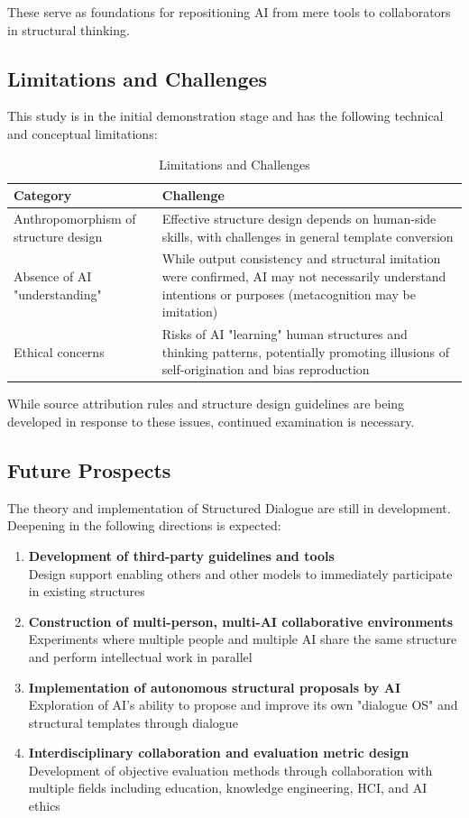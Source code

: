 \documentclass[11pt]{article}
\begin{document}
These serve as foundations for repositioning AI from mere tools to collaborators in structural thinking.
\subsection{Limitations and Challenges}
This study is in the initial demonstration stage and has the following technical and conceptual limitations:

\begin{table}[htbp]
\centering
\caption{Limitations and Challenges}
\begin{tabular}{p{4cm}|p{8cm}}
\hline
\textbf{Category} & \textbf{Challenge} \\
\hline
Anthropomorphism of structure design & Effective structure design depends on human-side skills, with challenges in general template conversion \\
\hline
Absence of AI "understanding" & While output consistency and structural imitation were confirmed, AI may not necessarily understand intentions or purposes (metacognition may be imitation) \\
\hline
Ethical concerns & Risks of AI "learning" human structures and thinking patterns, potentially promoting illusions of self-origination and bias reproduction \\
\hline
\end{tabular}
\label{tab:limitations}
\end{table}

While source attribution rules and structure design guidelines are being developed in response to these issues, continued examination is necessary.
\subsection{Future Prospects}
The theory and implementation of Structured Dialogue are still in development. Deepening in the following directions is expected:

\begin{enumerate}
\item \textbf{Development of third-party guidelines and tools} \\
Design support enabling others and other models to immediately participate in existing structures

\item \textbf{Construction of multi-person, multi-AI collaborative environments} \\
Experiments where multiple people and multiple AI share the same structure and perform intellectual work in parallel

\item \textbf{Implementation of autonomous structural proposals by AI} \\
Exploration of AI's ability to propose and improve its own "dialogue OS" and structural templates through dialogue

\item \textbf{Interdisciplinary collaboration and evaluation metric design} \\
Development of objective evaluation methods through collaboration with multiple fields including education, knowledge engineering, HCI, and AI ethics
\end{enumerate}
\end{document}
